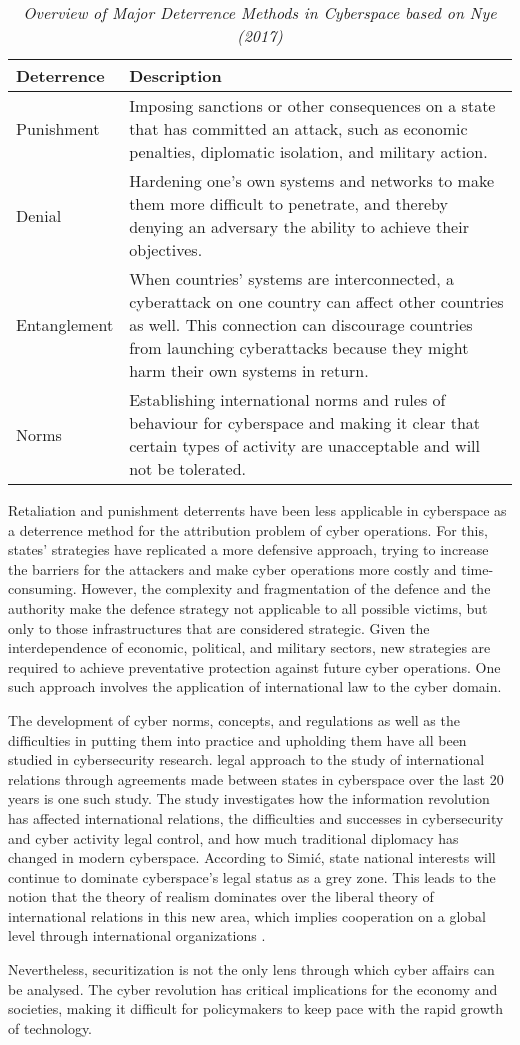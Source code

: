 \vspace{1cm}
\begin{table}[htbp]
  \centering
  \caption{\emph{Overview of Major Deterrence Methods in Cyberspace based on Nye (2017)}}
  \begin{tabular}{p{3cm}p{9cm}}
    \toprule
    \textbf{Deterrence} & \textbf{Description} \\
    \midrule
    Punishment & Imposing sanctions or other consequences on a state that has committed an attack, such as economic penalties, diplomatic isolation, and military action. \\
    Denial & Hardening one's own systems and networks to make them more difficult to penetrate, and thereby denying an adversary the ability to achieve their objectives. \\
    Entanglement & When countries' systems are interconnected, a cyberattack on one country can affect other countries as well. This connection can discourage countries from launching cyberattacks because they might harm their own systems in return. \\
    Norms & Establishing international norms and rules of behaviour for cyberspace and making it clear that certain types of activity are unacceptable and will not be tolerated. \\
    \bottomrule
  \end{tabular}
\end{table}
\vspace{1cm}

Retaliation and punishment deterrents have been less applicable in cyberspace as a deterrence method for the attribution problem of cyber operations. For this, states’ strategies have replicated a more defensive approach, trying to increase the barriers for the attackers and make cyber operations more costly and time-consuming. However, the complexity and fragmentation of the defence and the authority make the defence strategy not applicable to all possible victims, but only to those infrastructures that are considered strategic. Given the interdependence of economic, political, and military sectors, new strategies are required to achieve preventative protection against future cyber operations. One such approach involves the application of international law to the cyber domain. 


The development of cyber norms, concepts, and regulations as well as the difficulties in putting them into practice and upholding them have all been studied in cybersecurity research. \textcite{simi_2021_cyber} legal approach to the study of international relations through agreements made between states in cyberspace over the last 20 years is one such study. The study investigates how the information revolution has affected international relations, the difficulties and successes in cybersecurity and cyber activity legal control, and how much traditional diplomacy has changed in modern cyberspace. According to Simić, state national interests will continue to dominate cyberspace's legal status as a grey zone. This leads to the notion that the theory of realism dominates over the liberal theory of international relations in this new area, which implies cooperation on a global level through international organizations \autocite{simi_2021_cyber}.


Nevertheless, securitization is not the only lens through which cyber affairs can be analysed. The cyber revolution has critical implications for the economy and societies, making it difficult for policymakers to keep pace with the rapid growth of technology.  


